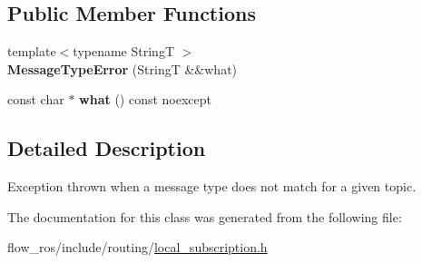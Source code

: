 \subsection*{Public Member Functions}
\begin{DoxyCompactItemize}
\item 
\mbox{\label{classflow__ros_1_1routing_1_1_message_type_error_ab9665e2b6000e0db3d5bbfcba7abf42b}} 
{\footnotesize template$<$typename StringT $>$ }\\{\bfseries Message\+Type\+Error} (StringT \&\&what)
\item 
\mbox{\label{classflow__ros_1_1routing_1_1_message_type_error_a3cce8f2383902caa8f6254d25554d89b}} 
const char $\ast$ {\bfseries what} () const noexcept
\end{DoxyCompactItemize}


\subsection{Detailed Description}
Exception thrown when a message type does not match for a given topic. 

The documentation for this class was generated from the following file\+:\begin{DoxyCompactItemize}
\item 
flow\+\_\+ros/include/routing/\hyperlink{local__subscription_8h}{local\+\_\+subscription.\+h}\end{DoxyCompactItemize}

